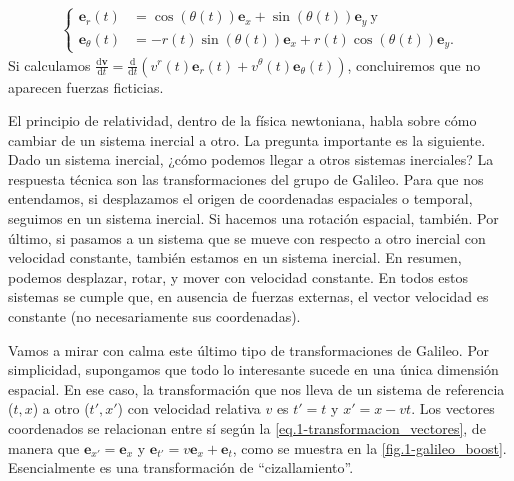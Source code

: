 \begin{observation}
    \begin{align}
        \left\{\begin{aligned}
            \mathbf{e}_{r}(t) &= \cos\left(\theta(t)\right) \mathbf{e}_{x} + \sin\left(\theta(t)\right) \mathbf{e}_{y}
            \ \text{y}\\
            \mathbf{e}_{\theta}(t) &= -r(t)\sin\left(\theta(t)\right) \mathbf{e}_{x} + r(t)\cos\left(\theta(t)\right) \mathbf{e}_{y}.
        \end{aligned}\right.
    \end{align}
    Si calculamos \(\frac{\mathrm{d}\mathbf{v}}{\mathrm{d}t}=\frac{\mathrm{d}}{\mathrm{d}t}\left(v^{r}(t)\mathbf{e}_r(t) + v^{\theta}(t)\mathbf{e}_\theta(t)\right)\), concluiremos que no aparecen fuerzas ficticias.
\end{observation}

El principio de relatividad, dentro de la física newtoniana, habla sobre cómo cambiar de un sistema inercial a otro. La pregunta importante es la siguiente. Dado un sistema inercial, ¿cómo podemos llegar a otros sistemas inerciales? La respuesta técnica son las transformaciones del grupo de Galileo. Para que nos entendamos, si desplazamos el origen de coordenadas espaciales o temporal, seguimos en un sistema inercial. Si hacemos una rotación espacial, también. Por último, si pasamos a un sistema que se mueve con respecto a otro inercial con velocidad constante, también estamos en un sistema inercial. En resumen, podemos desplazar, rotar, y mover con velocidad constante. En todos estos sistemas se cumple que, en ausencia de fuerzas externas, el vector velocidad es constante (no necesariamente sus coordenadas). 

Vamos a mirar con calma este último tipo de transformaciones de Galileo. Por simplicidad, supongamos que todo lo interesante sucede en una única dimensión espacial. En ese caso, la transformación que nos lleva de un sistema de referencia (\(t, x\)) a otro (\(t', x'\)) con velocidad relativa \(v\) es \(t' = t\) y \(x' = x - vt\). Los vectores coordenados se relacionan entre sí según la \cref{eq.1-transformacion_vectores}, de manera que \(\mathbf{e}_{x'} = \mathbf{e}_{x}\) y \(\mathbf{e}_{t'} = v\mathbf{e}_{x} + \mathbf{e}_{t}\), como se muestra en la \cref{fig.1-galileo_boost}. Esencialmente es una transformación de ``cizallamiento''.

